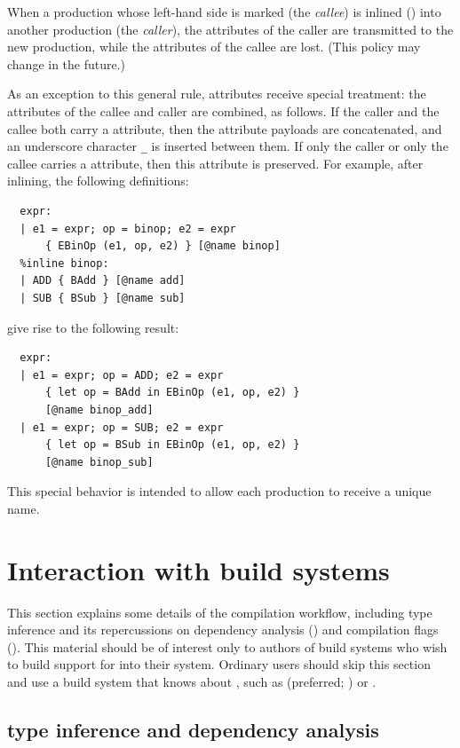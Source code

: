 \documentclass[onecolumn,11pt,nocopyrightspace,preprint]{sigplanconf}
\begin{document}
When a production whose left-hand side is marked \dinline
(the \emph{callee})
is inlined ()
into another production
(the \emph{caller}),
%
the attributes of the caller are transmitted to the new production,
while the attributes of the callee are lost.
(This policy may change in the future.)

As an exception to this general rule,
\dname attributes receive special treatment:
the \dname attributes of the callee and caller are combined, as follows.
%
If the caller and the callee both carry a \dname attribute,
then the attribute payloads are concatenated,
and an underscore character \verb+_+ is
inserted between them.
%
If only the caller or only the callee carries a \dname attribute,
then this attribute is preserved.
%
For example, after inlining, the following definitions:
%
\begin{verbatim}
  expr:
  | e1 = expr; op = binop; e2 = expr
      { EBinOp (e1, op, e2) } [@name binop]
  %inline binop:
  | ADD { BAdd } [@name add]
  | SUB { BSub } [@name sub]
\end{verbatim}
%
give rise to the following result:
%
\begin{verbatim}
  expr:
  | e1 = expr; op = ADD; e2 = expr
      { let op = BAdd in EBinOp (e1, op, e2) }
      [@name binop_add]
  | e1 = expr; op = SUB; e2 = expr
      { let op = BSub in EBinOp (e1, op, e2) }
      [@name binop_sub]
\end{verbatim}
%
This special behavior is intended to allow each production
to receive a unique name.


\section{Interaction with build systems}
\label{sec:build}

This section explains some details of the compilation workflow, including
\ocaml type inference and its repercussions on dependency analysis
() and compilation flags ().
%
This material should be of interest only to authors of build systems
who wish to build support for \menhir into their system.
%
Ordinary users should skip this section and use a build system that knows
about \menhir, such as \hyperlink{dune}{\dune} (preferred; )
or \ocamlbuild.

\subsection{\ocaml type inference and dependency analysis}
\label{sec:build:infer}
\end{document}
